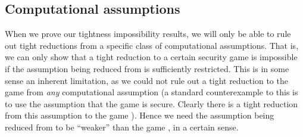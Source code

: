 \begin{figure}
  \begin{pcvstack}[center,space=0.5cm]
    \begin{pchstack}[space=1cm]
    \end{pchstack}
  \end{pcvstack}\caption{}\label{fig:ecpa}
\end{figure}


\subsection{Computational assumptions}

When we prove our tightness impossibility results,
we will only be able to rule out tight reductions from a specific class of computational assumptions.
That is, we can only show that a tight reduction to a certain security game \gameG is impossible
if the assumption being reduced from is sufficiently restricted.
This is in some sense an inherent limitation, as we could not rule out a tight reduction to the game \gameG
from \emph{any} computational assumption
(a standard counterexample to this is to use the assumption that the game \gameG is secure.
Clearly there is a tight reduction from this assumption to the game \gameG).
Hence we need the assumption being reduced from to be ``weaker''
than the game \gameG, in a certain sense.

